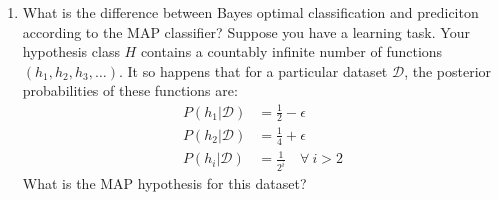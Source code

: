 \documentclass{article}
\renewcommand{\dim}{\mathcal{D}}
\begin{document}
\begin{enumerate}
\begin{itemize}
\begin{align}
&= \arg\max_{h\in H} \sum_{i=1}^{m}\log\left(\frac{1}{\sigma\sqrt{2\pi}}\right)+\log\left[\exp\left(-\frac{(y_{i}-h(\mathbf{x}_{i}))^{2}}{2\sigma^{2}}\right)\right]\\
&= \arg\max_{h\in H} \sum_{i=1}^{m}\left(-\log\left(\sigma\sqrt{2\pi}\right)\right)-\frac{(y_{i}-h(\mathbf{x}_{i}))^{2}}{2\sigma^{2}}
\intertext{where we can remove the first term and the $2\sigma^{2}$ term since they are constants and are independent of the maximization, resulting in}
h_{ML} &= \arg\max_{h\in H}\sum_{i=1}^{m}\left(-(y_{i}-h(\mathbf{x}_{i}))^{2}\right)
\intertext{which gives the hypothesis of}
h_{ML} &= \arg\min_{h\in H}\sum_{i=1}^{m}\left(y_{i}-h(\mathbf{x}_{i})\right)^{2}
\intertext{where for linear functions we consider $h(\mathbf{x}_{i})= \mathbf{w}^{T}\mathbf{x}_{i}$}
h_{ML} &= \arg\min_{h\in H}\sum_{i=1}^{m}\left(y_{i}-\mathbf{w}^{T}\mathbf{x}_{i}\right)
\end{align}
which is the probabilistic version of least squares regression
\end{itemize}



\item What is the difference between Bayes optimal classification and prediciton according to the MAP classifier? Suppose you have a learning task. Your hypothesis class $H$ contains a countably infinite number of functions $(h_{1},h_{2},h_{3},\ldots)$. It so happens that for a particular dataset $\dim$, the posterior probabilities of these functions are:
\begin{align*}
P(h_{1}|\dim) &= \frac{1}{2}-\epsilon\\
P(h_{2}|\dim) &= \frac{1}{4}+\epsilon\\
P(h_{i}|\dim) &= \frac{1}{2^{i}}\quad \forall\ i>2
\end{align*}
What is the MAP hypothesis for this dataset?


\end{enumerate}
\end{document}

